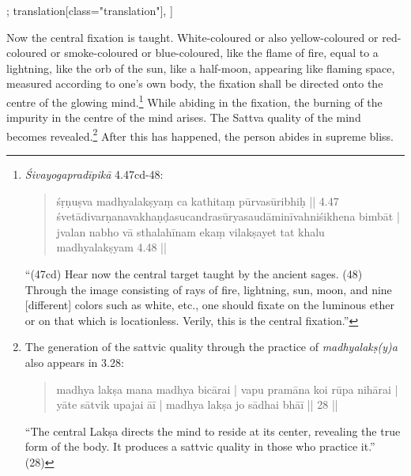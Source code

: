 \begin{alignment}[
  texts=edition[class="edition"];
  translation[class="translation"],
  ]
\begin{translation}
\bigskip
\begin{tlate}
Now the central fixation is taught. White-coloured or also yellow-coloured or red-coloured or smoke-coloured or blue-coloured, like the flame of fire, equal to a lightning, like the orb of the sun, like a half-moon, appearing like flaming space, measured according to one's own body, the fixation shall be directed onto the centre of the glowing mind.\footnote{\textit{Śivayogapradīpikā} 4.47cd-48: \begin{quote} śṛṇuṣva madhyalakṣyaṃ ca kathitaṃ pūrvasūribhiḥ || 4.47 \\
 śvetādivarṇanavakhaṇḍasucandrasūryasaudāminīvahniśikhena bimbāt | \\
 jvalan nabho vā sthalahīnam ekaṃ vilakṣayet tat khalu madhyalakṣyam 4.48 ||
 \end{quote}
``(47cd) Hear now the central target taught by the ancient sages. (48) Through the image consisting of rays of fire, lightning, sun, moon, and nine [different] colors such as white, etc., one should fixate on the luminous ether or on that which is locationless. Verily, this is the central fixation.''}
While abiding in the fixation, the burning of the impurity in the centre of the mind arises. The Sattva quality of the mind becomes revealed.\footnote{The generation of the sattvic quality through the practice of \textit{madhyalakṣ(y)a} also appears in  3.28: \begin{quote}madhya lakṣa mana madhya bicārai | vapu pramāna koi rūpa nihārai |\\
yāte sātvik upajai āī | madhya lakṣa jo sādhai bhāī || 28 ||\end{quote} ``The central Lakṣa directs the mind to reside at its center, revealing the true form of the body. It produces a sattvic quality in those who practice it.'' (28)} After this has happened, the person abides in supreme bliss.   
\end{tlate}
  \end{translation}
\end{alignment}
